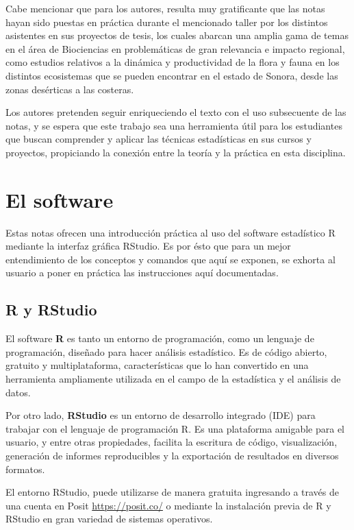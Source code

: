 \documentclass[
]{book}
\begin{document}
Cabe mencionar que para los autores, resulta muy gratificante que las notas hayan sido puestas en práctica durante el mencionado taller por los distintos asistentes en sus proyectos de tesis, los cuales abarcan una amplia gama de temas en el área de Biociencias en problemáticas de gran relevancia e impacto regional, como estudios relativos a la dinámica y productividad de la flora y fauna en los distintos ecosistemas que se pueden encontrar en el estado de Sonora, desde las zonas desérticas a las costeras.

Los autores pretenden seguir enriqueciendo el texto con el uso subsecuente de las notas, y se espera que este trabajo sea una herramienta útil para los estudiantes que buscan comprender y aplicar las técnicas estadísticas en sus cursos y proyectos, propiciando la conexión entre la teoría y la práctica en esta disciplina.

\hypertarget{el-software}{%
\chapter{El software}\label{el-software}}

Estas notas ofrecen una introducción práctica al uso del software estadístico R mediante la interfaz gráfica RStudio. Es por ésto que para un mejor entendimiento de los conceptos y comandos que aquí se exponen, se exhorta al usuario a poner en práctica las instrucciones aquí documentadas.

\hypertarget{r-y-rstudio}{%
\section{R y RStudio}\label{r-y-rstudio}}

El software \textbf{R} es tanto un entorno de programación, como un lenguaje de programación, diseñado para hacer análisis estadístico. Es de código abierto, gratuito y multiplataforma, características que lo han convertido en una herramienta ampliamente utilizada en el campo de la estadística y el análisis de datos.

Por otro lado, \textbf{RStudio} es un entorno de desarrollo integrado (IDE) para trabajar con el lenguaje de programación R. Es una plataforma amigable para el usuario, y entre otras propiedades, facilita la escritura de código, visualización, generación de informes reproducibles y la exportación de resultados en diversos formatos.

El entorno RStudio, puede utilizarse de manera gratuita ingresando a través de una cuenta en Posit \url{https://posit.co/} o mediante la instalación previa de R y RStudio en gran variedad de sistemas operativos.
\end{document}
